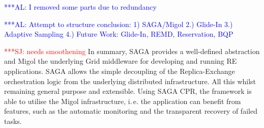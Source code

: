 \documentclass{rspublic}
\newcommand{\alnote}[1]{ {\textcolor{blue} { ***AL: #1 }}}
\newcommand{\jhanote}[1]{ {\textcolor{red} { ***SJ: #1 }}}
\newcommand{\alnote}[1]{}
\newcommand{\jhanote}[1]{}
\begin{document}
\alnote{I removed some parts due to redundancy}
% 
% 




                    
\alnote{Attempt to structure conclusion:
1) SAGA/Migol 2.) Glide-In 3.) Adaptive Sampling 4.) Future Work: Glide-In, REMD, Reservation, BQP}
                                         
\jhanote{needs smoothening} In summary, SAGA provides a well-defined abstraction 
and Migol the underlying Grid middleware for developing and running
RE applications.
SAGA allows the simple decoupling of the Replica-Exchange orchestration 
logic from the underlying distributed infrastructure. All this whilst remaining
general purpose and extensible. 
Using SAGA CPR, the framework is able to utilise the Migol infrastructure, 
i.\,e. the application can benefit from features, such as the automatic 
monitoring and the transparent recovery of failed tasks.  
                 
\end{document}
